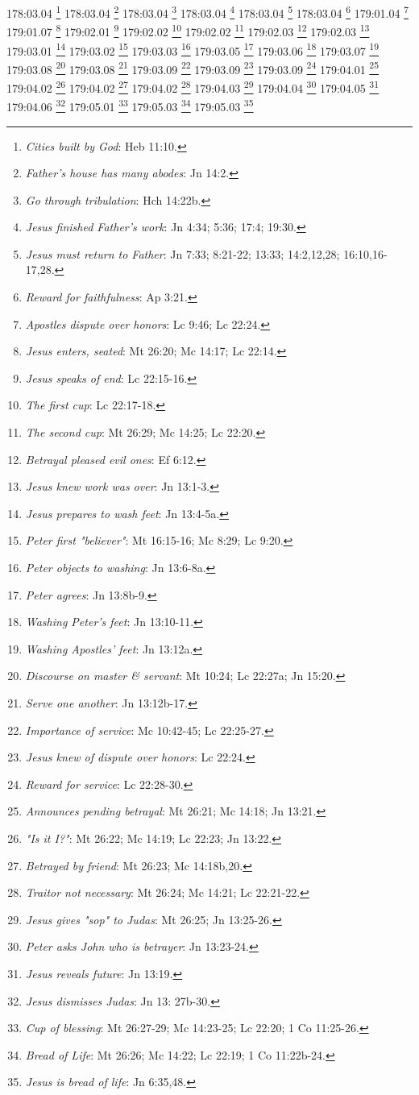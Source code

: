 178:03.04 \footnote{\textit{Cities built by God}: Heb 11:10.}
178:03.04 \footnote{\textit{Father's house has many abodes}: Jn 14:2.}
178:03.04 \footnote{\textit{Go through tribulation}: Hch 14:22b.}
178:03.04 \footnote{\textit{Jesus finished Father's work}: Jn 4:34; 5:36; 17:4; 19:30.}
178:03.04 \footnote{\textit{Jesus must return to Father}: Jn 7:33; 8:21-22; 13:33; 14:2,12,28; 16:10,16-17,28.}
178:03.04 \footnote{\textit{Reward for faithfulness}: Ap 3:21.}
179:01.04 \footnote{\textit{Apostles dispute over honors}: Lc 9:46; Lc 22:24.}
179:01.07 \footnote{\textit{Jesus enters, seated}: Mt 26:20; Mc 14:17; Lc 22:14.}
179:02.01 \footnote{\textit{Jesus speaks of end}: Lc 22:15-16.}
179:02.02 \footnote{\textit{The first cup}: Lc 22:17-18.}
179:02.02 \footnote{\textit{The second cup}: Mt 26:29; Mc 14:25; Lc 22:20.}
179:02.03 \footnote{\textit{Betrayal pleased evil ones}: Ef 6:12.}
179:02.03 \footnote{\textit{Jesus knew work was over}: Jn 13:1-3.}
179:03.01 \footnote{\textit{Jesus prepares to wash feet}: Jn 13:4-5a.}
179:03.02 \footnote{\textit{Peter first "believer"}: Mt 16:15-16; Mc 8:29; Lc 9:20.}
179:03.03 \footnote{\textit{Peter objects to washing}: Jn 13:6-8a.}
179:03.05 \footnote{\textit{Peter agrees}: Jn 13:8b-9.}
179:03.06 \footnote{\textit{Washing Peter's feet}: Jn 13:10-11.}
179:03.07 \footnote{\textit{Washing Apostles' feet}: Jn 13:12a.}
179:03.08 \footnote{\textit{Discourse on master & servant}: Mt 10:24; Lc 22:27a; Jn 15:20.}
179:03.08 \footnote{\textit{Serve one another}: Jn 13:12b-17.}
179:03.09 \footnote{\textit{Importance of service}: Mc 10:42-45; Lc 22:25-27.}
179:03.09 \footnote{\textit{Jesus knew of dispute over honors}: Lc 22:24.}
179:03.09 \footnote{\textit{Reward for service}: Lc 22:28-30.}
179:04.01 \footnote{\textit{Announces pending betrayal}: Mt 26:21; Mc 14:18; Jn 13:21.}
179:04.02 \footnote{\textit{"Is it I?"}: Mt 26:22; Mc 14:19; Lc 22:23; Jn 13:22.}
179:04.02 \footnote{\textit{Betrayed by friend}: Mt 26:23; Mc 14:18b,20.}
179:04.02 \footnote{\textit{Traitor not necessary}: Mt 26:24; Mc 14:21; Lc 22:21-22.}
179:04.03 \footnote{\textit{Jesus gives "sop" to Judas}: Mt 26:25; Jn 13:25-26.}
179:04.04 \footnote{\textit{Peter asks John who is betrayer}: Jn 13:23-24.}
179:04.05 \footnote{\textit{Jesus reveals future}: Jn 13:19.}
179:04.06 \footnote{\textit{Jesus dismisses Judas}: Jn 13: 27b-30.}
179:05.01 \footnote{\textit{Cup of blessing}: Mt 26:27-29; Mc 14:23-25; Lc 22:20; 1 Co 11:25-26.}
179:05.03 \footnote{\textit{Bread of Life}: Mt 26:26; Mc 14:22; Lc 22:19; 1 Co 11:22b-24.}
179:05.03 \footnote{\textit{Jesus is bread of life}: Jn 6:35,48.}

